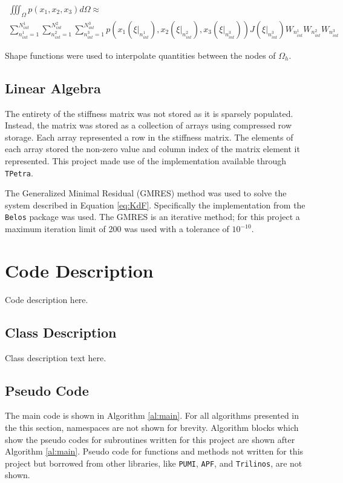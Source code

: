 \documentclass[a4paper, 12pt]{article}
\begin{document}
\begin{multline} \label{eq:J_numInt}
\iiint_{\Omega} p(x_1, x_2, x_3) d\Omega
  \approx \\
  \sum_{n^1_{int}=1}^{N^1_{int}} 
  \sum_{n^2_{int}=1}^{N^2_{int}} 
  \sum_{n^3_{int}=1}^{N^3_{int}} 
  p(
  x_1(\xi\Big|_{n^1_{int}}),
  x_2(\xi\Big|_{n^2_{int}}),
  x_3(\xi\Big|_{n^3_{int}}))
  J( \xi\Big|_{n^3_{int}})
  W_{n^1_{int}}
  W_{n^2_{int}}
  W_{n^3_{int}}
\end{multline}

Shape functions were used to interpolate quantities between the
nodes of $\Omega_h$. 


\subsection{Linear Algebra} \label{subsec:LinAlg}
The entirety of the stiffness matrix was not stored as it is 
sparsely populated. Instead, the matrix was stored as a collection
of arrays using compressed row storage. 
Each array represented a row in the stiffness matrix. 
The elements of each array stored the non-zero value and column index of the 
matrix element it represented. This project made use 
of the implementation available through \texttt{TPetra}.

The Generalized Minimal Residual (GMRES) method was used to solve 
the system described in Equation \ref{eq:KdF}. Specifically
the implementation from the \texttt{Belos} package was used.  
The GMRES is an iterative method; for this project a maximum 
iteration limit of 200 was used with a tolerance of $10^{-10}$.

\section{Code Description} \label{sec:codeDes}
Code description here.

\subsection{Class Description} \label{subsec:class}
Class description text here.

\subsection{Pseudo Code} \label{subsec:pseudo}
The main code is shown in Algorithm \ref{al:main}. For all 
algorithms presented in the this section, namespaces 
are not shown for brevity. Algorithm blocks which 
show the pseudo codes for subroutines written for this 
project are shown after Algorithm \ref{al:main}. 
Pseudo code for functions and methods not written for this 
project but borrowed from other libraries, like \texttt{PUMI},
\texttt{APF}, and \texttt{Trilinos}, are not shown.
\end{document}
